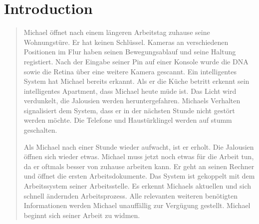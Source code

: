 
\chapter{Introduction}
\label{introduction}

\begin{quotation}
Michael öffnet nach einem längeren Arbeitstag zuhause seine Wohnungstüre. Er hat keinen Schlüssel. Kameras an verschiedenen Positionen im Flur haben seinen Bewegungsablauf und seine Haltung registiert. Nach der Eingabe seiner Pin auf einer Konsole wurde die DNA sowie die Retina über eine weitere Kamera gescannt. Ein intelligentes System hat Michael bereits erkannt. Als er die Küche betritt erkennt sein intelligentes Apartment, dass Michael heute müde ist. Das Licht wird verdunkelt, die Jalousien werden heruntergefahren. Michaels Verhalten signalisiert dem System, dass er in der nächsten Stunde nicht gestört werden möchte. Die Telefone und Haustürklingel werden auf stumm geschalten. 

Als Michael nach einer Stunde wieder aufwacht, ist er erholt. Die Jalousien öffnen sich wieder etwas. Michael muss jetzt noch etwas für die Arbeit tun, da er oftmals besser von zuhause arbeiten kann. Er geht an seinen Rechner und öffnet die ersten Arbeitsdokumente. Das System ist gekoppelt mit dem Arbeitssystem seiner Arbeitsstelle. Es erkennt Michaels aktuellen und sich schnell ändernden Arbeitsprozess. Alle relevanten weiteren benötigten Informationen werden Michael unauffällig zur Vergügung gestellt. Michael beginnt sich seiner Arbeit zu widmen.
\end{quotation}

